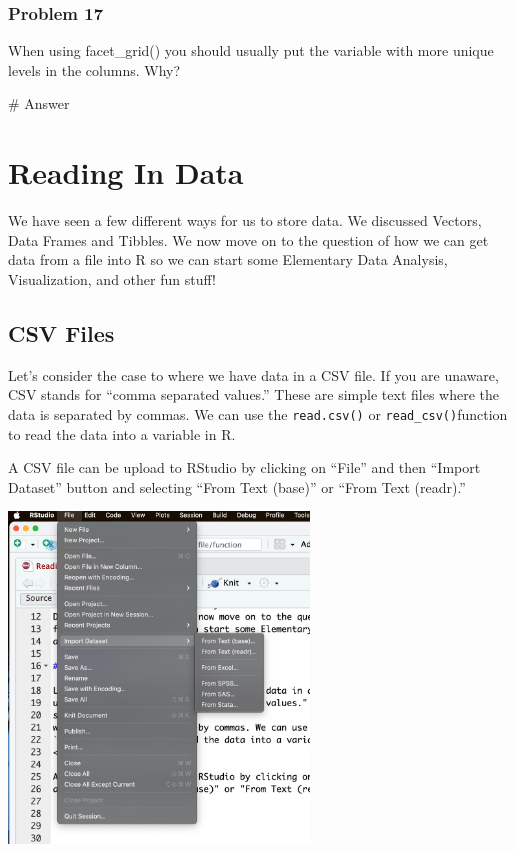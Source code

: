 \documentclass[
  letterpaper,
  DIV=11,
  numbers=noendperiod]{scrreprt}
\newenvironment{Shaded}{\begin{snugshade}}{\end{snugshade}}
\newcommand{\CommentTok}[1]{\textcolor[rgb]{0.37,0.37,0.37}{#1}}
\begin{document}
\subsection*{Problem 17}\label{problem-17-1}

When using facet\_grid() you should usually put the variable with more
unique levels in the columns. Why?

\begin{Shaded}
\begin{Highlighting}[]
\CommentTok{\# Answer}
\end{Highlighting}
\end{Shaded}


\chapter*{Reading In Data}\label{reading-in-data}


We have seen a few different ways for us to store data. We discussed
Vectors, Data Frames and Tibbles. We now move on to the question of how
we can get data from a file into R so we can start some Elementary Data
Analysis, Visualization, and other fun stuff!

\section*{CSV Files}\label{csv-files}


Let's consider the case to where we have data in a CSV file. If you are
unaware, CSV stands for ``comma separated values.'' These are simple
text files where the data is separated by commas. We can use the
\texttt{read.csv()} or \texttt{read\_csv()}function to read the data
into a variable in R.

A CSV file can be upload to RStudio by clicking on ``File'' and then
``Import Dataset'' button and selecting ``From Text (base)'' or ``From
Text (readr).''

\includegraphics[width=0.6\textwidth,height=\textheight]{./images/Read-In-Data-1.jpg}
\end{document}
